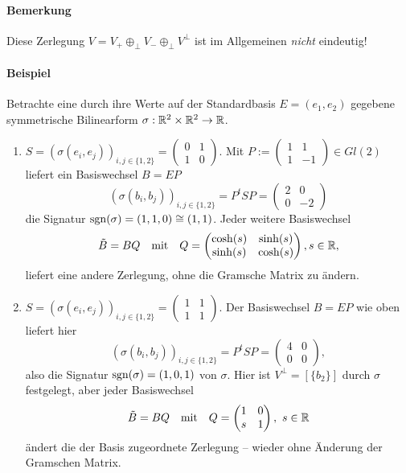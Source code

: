 \paragraph{Bemerkung}
	Diese Zerlegung $ V= V_+ \oplus_\perp V_- \oplus_\perp V^\perp $ ist im Allgemeinen \emph{nicht} eindeutig!
\paragraph{Beispiel}
	Betrachte eine durch ihre Werte auf der Standardbasis $ E=(e_1,e_2) $ gegebene symmetrische Bilinearform $ \sigma: \mathbb{R}^2\times \mathbb{R}^2 \to \mathbb{R} $.
		\begin{enumerate}
			\item $ S=(\sigma(e_i,e_j))_{i,j\in \{1,2\}} =
			\begin{pmatrix}
				0&1\\1& 0
			\end{pmatrix} $. Mit $ P:=\begin{pmatrix}
			1&1\\ 1& -1
			\end{pmatrix}\in Gl(2) $ liefert ein Basiswechsel $ B=EP $
				\[ (\sigma(b_i,b_j))_{i,j\in \{1,2\}} = P^tSP = \begin{pmatrix}
				2 & 0 \\ 0 & -2
				\end{pmatrix} \]
			die Signatur $ \operatorname{sgn}(\sigma) = (1,1,0)\cong (1,1) $.
			Jeder weitere Basiswechsel
				\[ \tilde{B}=BQ \quad\text{mit}\quad Q = \begin{pmatrix}
				\cosh(s) & \sinh(s)\\ \sinh(s)& \cosh(s) 
				\end{pmatrix}, s\in \mathbb{R}, \]
			liefert eine andere Zerlegung, ohne die Gramsche Matrix zu ändern.
			\item $ S=(\sigma(e_i,e_j))_{i,j\in \{1,2\}}= \begin{pmatrix}
			1 & 1\\ 1 & 1
			\end{pmatrix}. $ Der Basiswechsel $ B=EP $ wie oben liefert hier
				\[ (\sigma(b_i,b_j))_{i,j\in \{1,2\}} = P^tSP = \begin{pmatrix}
				4 & 0 \\ 0 & 0
				\end{pmatrix}, \]
			also die Signatur $ \operatorname{sgn}(\sigma) = (1,0,1) $ von $ \sigma $. Hier ist $ V^\perp = [\{b_2\}]$ durch $ \sigma $ festgelegt, aber jeder Basiswechsel
				\[ \tilde{B} = BQ \quad\text{mit}\quad Q= \begin{pmatrix}
				1 & 0 \\ s & 1
				\end{pmatrix},\ s\in \mathbb{R} \]
			ändert die der Basis zugeordnete Zerlegung -- wieder ohne Änderung der Gramschen Matrix.
		\end{enumerate}

